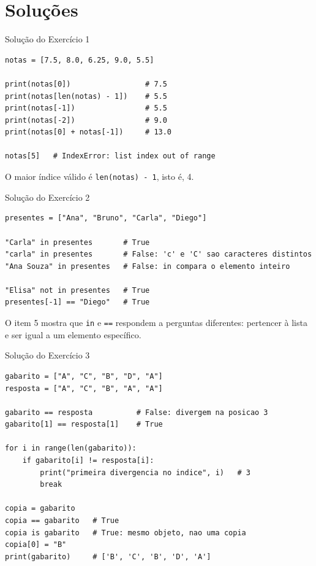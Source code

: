 \documentclass[aspectratio=169]{beamer}
\begin{document}
\section{Soluções}

\begin{frame}[fragile]{Solução do Exercício 1}
\begin{lstlisting}
notas = [7.5, 8.0, 6.25, 9.0, 5.5]

print(notas[0])                 # 7.5
print(notas[len(notas) - 1])    # 5.5
print(notas[-1])                # 5.5
print(notas[-2])                # 9.0
print(notas[0] + notas[-1])     # 13.0

notas[5]   # IndexError: list index out of range
\end{lstlisting}

O maior índice válido é \texttt{len(notas) - 1}, isto é, 4.
\end{frame}

\begin{frame}[fragile]{Solução do Exercício 2}
\begin{lstlisting}
presentes = ["Ana", "Bruno", "Carla", "Diego"]

"Carla" in presentes       # True
"carla" in presentes       # False: 'c' e 'C' sao caracteres distintos
"Ana Souza" in presentes   # False: in compara o elemento inteiro

"Elisa" not in presentes   # True
presentes[-1] == "Diego"   # True
\end{lstlisting}

O item 5 mostra que \texttt{in} e \texttt{==} respondem a perguntas diferentes: pertencer à lista e ser igual a um elemento específico.
\end{frame}

\begin{frame}[fragile]{Solução do Exercício 3}
\begin{lstlisting}
gabarito = ["A", "C", "B", "D", "A"]
resposta = ["A", "C", "B", "A", "A"]

gabarito == resposta          # False: divergem na posicao 3
gabarito[1] == resposta[1]    # True

for i in range(len(gabarito)):
    if gabarito[i] != resposta[i]:
        print("primeira divergencia no indice", i)   # 3
        break

copia = gabarito
copia == gabarito   # True
copia is gabarito   # True: mesmo objeto, nao uma copia
copia[0] = "B"
print(gabarito)     # ['B', 'C', 'B', 'D', 'A']
\end{lstlisting}
\end{frame}
\end{document}
